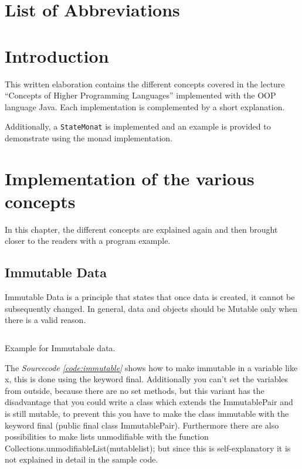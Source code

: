 \documentclass[a4paper,12pt,twoside]{scrreprt}
\begin{document}
\chapter*{List of Abbreviations}
\begin{acronym}
\end{acronym}

\cleardoublepage
{}
\chapter{Introduction}
This written elaboration contains the different concepts covered in the lecture \enquote{Concepts of Higher Programming Languages} implemented with the \ac{OOP} language Java. Each implementation is complemented by a short explanation.

Additionally, a \texttt{StateMonat} is implemented and an example is provided to demonstrate using the monad implementation.

\chapter{Implementation of the various concepts}
In this chapter, the different concepts are explained again and then brought closer to the readers with a program example.
\section{Immutable Data}
Immutable Data is a principle that states that once data is created, it cannot be subsequently changed. In general, data and objects should be Mutable only when there is a valid reason. 
\begin{listing}[ht]
    \inputminted[fontsize=\footnotesize,linenos]{java}{./code/ImmutablePair.java}
    \caption[Example for Immutabale data]{Example for Immutabale data.}
    \label{code:immutable}
\end{listing}
The \emph{Sourcecode \ref{code:immutable}} shows how to make immutable in a variable like x, this is done using the keyword final. Additionally you can't set the variables from outside, because there are no set methods, but this variant has the disadvantage that you could write a class which extends the ImmutablePair and is still mutable, to prevent this you have to make the class immutable with the keyword final (public final class ImmutablePair).
Furthermore there are also possibilities to make lists unmodifiable with the function Collections.unmodifiableList(mutablelist); but since this is self-explanatory it is not explained in detail in the sample code.
\clearpage
\end{document}
